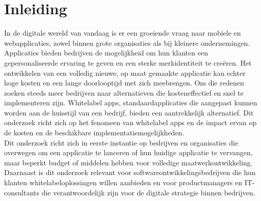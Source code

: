 


% 

\section{Inleiding}%
\label{sec:inleiding}

In de digitale wereld van vandaag is er een groeiende vraag naar mobiele en webapplicaties, zowel binnen grote organisaties als bij kleinere ondernemingen.
Applicaties bieden bedrijven de mogelijkheid om hun klanten een gepersonaliseerde ervaring te geven en een sterke merkidentiteit te creëren. 
Het ontwikkelen van een volledig nieuwe, op maat gemaakte applicatie kan echter hoge kosten en een lange doorlooptijd met zich meebrengen. 
Om die redenen zoeken steeds meer bedrijven naar alternatieven die kosteneffectief en snel te implementeren zijn.
Whitelabel apps, standaardapplicaties die aangepast kunnen worden aan de huisstijl van een bedrijf, bieden een aantrekkelijk alternatief. 
Dit onderzoek richt zich op het fenomeen van whitelabel apps en de impact ervan op de kosten en de beschikbare implementatiemogelijkheden.\\

Dit onderzoek richt zich in eerste instantie op bedrijven en organisaties die overwegen om een applicatie te lanceren of hun huidige applicatie te vervangen, maar beperkt budget of middelen hebben voor volledige maatwerkontwikkeling.\\
Daarnaast is dit onderzoek relevant voor softwareontwikkelingsbedrijven die hun klanten whitelabeloplossingen willen aanbieden en voor productmanagers en IT-consultants die verantwoordelijk zijn voor de digitale strategie binnen bedrijven.\\

